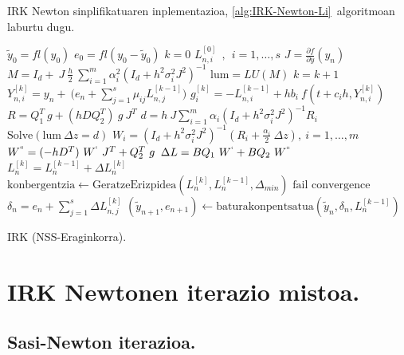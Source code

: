 \begin{enumerate}
\end{enumerate}


IRK Newton sinplifikatuaren inplementazioa, \ref{alg:IRK-Newton-Li}~algoritmoan laburtu dugu. 

\begin{algorithm}[h!]
 \BlankLine
  $\tilde{y}_0=fl(y_0)$\;
  $e_0=fl(y_0-\tilde{y}_0)$\;
  {
   \BlankLine
   $k=0$\;
     $L_{n,i}^{[0]} \ \ , \ \ i=1,\dots,s $\;
   \BlankLine
   $J=\frac{\partial f}{\partial y}(y_n) $\; 
   \BlankLine
   $ M=I_d+ \ J \ \frac{h}{2}\ \sum\limits_{i=1}^{m} \alpha_i^2 (I_d+h^2 \sigma_i^2 J^2)^{-1} $\;
   $ \mathrm{lum}=LU(M)$\;
   \BlankLine  
   {
    \BlankLine 
    $k=k+1$\;
    $Y_{n,i}^{[k]}=y_{n} + \ \big(e_n+\sum\limits_{j=1}^{s} \mu_{ij} L_{n,j}^{[k-1]}\big)  $\;  
    \BlankLine
    $g_i^{[k]}= -L_{n,i}^{[k-1]}+ hb_i \ f(t+c_ih, Y_{n,i}^{[k]}) $\;
    \BlankLine
    $R=Q_1^T \ g  + (h D Q_2^T) \ g \ J^T $\;
    $d=h \ J \sum\limits_{i=1}^{m}\alpha_i (I_d+h^2\sigma_i^2J^2)^{-1}R_i$\;
    $\text{Solve}(\mathrm{lum} \ \Delta z = d)$\;
    \BlankLine 
    $W_i=(I_d+h^2\sigma_i^2J^2)^{-1} (R_i+\frac{\alpha_i}{2} \ \Delta z), \ i=1,\dots,m$\;
    \BlankLine
    $W^{``}= (-hD^T) \ W^{`} \ J^T+Q_2^T \ g$\;
    \BlankLine
    $\Delta L =B Q_1 \ W^{`}+B Q_2 \ W^{``} $\;
    $L_n^{[k]}=L_n^{[k-1]}+\Delta L_n^{[k]}$\;
    $\text{konbergentzia} \leftarrow \text{GeratzeErizpidea}(L_n^{[k]},L_n^{[k-1]},\Delta_{min}) $\;
   }
 \BlankLine
   {
    {$\text{fail convergence}$\;}
   }
   $\delta_{n}={e}_{n} + \sum\limits_{j=1}^{s}\Delta L_{n,j}^{[k]}$\;
   $(\tilde y_{n+1}, e_{n+1})\leftarrow \text{baturakonpentsatua}(\tilde y_{n},\delta_{n},L_{n}^{[k-1]})$\;
 }
 \caption{IRK (NSS-Eraginkorra).}
 \label{alg:IRK-Newton-Li}
\end{algorithm}


\clearpage


\section{IRK Newtonen iterazio mistoa.}
\label{sec:7.6}

\subsection{Sasi-Newton iterazioa.}


